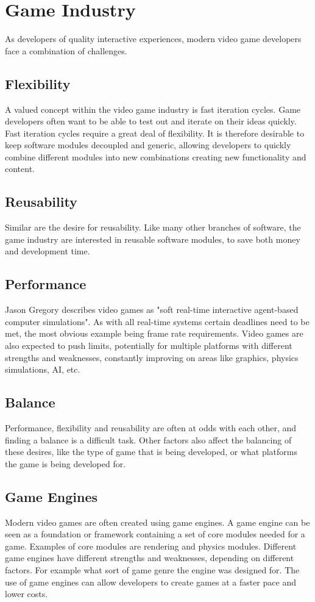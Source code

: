 \section{Game Industry}
As developers of quality interactive experiences, modern video game developers face a
combination of challenges.

\subsection{Flexibility}
A valued concept within the video game industry is fast iteration cycles.
Game developers often want to be able to test out and iterate on their ideas quickly.
Fast iteration cycles require a great deal of flexibility.
It is therefore desirable to keep software modules decoupled and generic,
allowing developers to quickly combine different modules into new combinations creating new functionality
and content.

\subsection{Reusability}
Similar are the desire for reusability.
Like many other branches of software, the game industry are interested in reusable software modules,
to save both money and development time.

\subsection{Performance}
\label{subsec:introduction_game_industry_performance}
Jason Gregory\cite[p. 9]{game_engine_architecture} describes video games as "soft real-time interactive agent-based computer simulations".
As with all real-time systems certain deadlines need to be met, the most obvious example being frame rate requirements.
Video games are also expected to push limits, potentially for multiple platforms with different strengths and weaknesses,
constantly improving on areas like graphics, physics simulations, AI, etc.

\subsection{Balance}
Performance, flexibility and reusability are often at odds with each other, and finding a balance is a difficult task.
Other factors also affect the balancing of these desires, like the type of game that is being developed,
or what platforms the game is being developed for.

\subsection{Game Engines}
Modern video games are often created using game engines. A game engine can be seen as a foundation or framework
containing a set of core modules needed for a game. Examples of core modules are rendering and physics modules.
Different game engines have different strengths and weaknesses, depending on different factors.
For example what sort of game genre the engine was designed for.
The use of game engines can allow developers to create games at a faster pace and lower costs.
